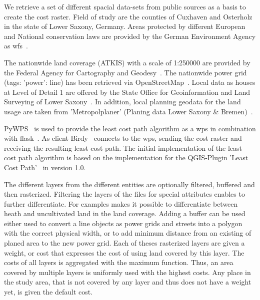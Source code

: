 
We retrieve a set of different spacial data-sets from  public sources as a basis to create the cost raster.
Field of study are the counties of Cuxhaven and Osterholz in the state of Lower Saxony, Germany.
Areas protected by different European and National conservation laws are provided by the German Environment Agency
as \acrfull{wfs}~\cite{noauthor_schutzgebiete_2015}.

The nationwide land coverage (ATKIS) with a scale of 1:250000 are provided by the Federal Agency for Cartography
and Geodesy~\cite{noauthor_digitales_2021}.
The nationwide power grid (tags: 'power': line) has been retrieved via OpenStreetMap~\cite{boeing_osmnx_2017}.
Local data as houses at Level of Detail 1 are offered by the State Office for Geoinformation and Land Surveying of
Lower Saxony~\cite{noauthor_opengeodatani_2022}.
In addition, local planning geodata for the land usage are taken
from 'Metropolplaner' (Planing data Lower Saxony \& Bremen)~\cite{noauthor_metropolplaner_2022}.

PyWPS~\cite{noauthor_welcome_2016} is used to provide the least cost path algorithm as a \acrfull{wps} in combination with flask~\cite{noauthor_flask_nodate}.
As client Birdy~\cite{noauthor_birdy_nodate} connects to the \acrshort{wps}, sending the cost raster and receiving the resulting least cost path.
The initial implementation of the least cost path algorithm is based on the implementation for the QGIS-Plugin
'Least Cost Path'~\cite{noauthor_leastcostpathdijkstra_algorithmpy_2022} in version 1.0.


The different layers from the different entities are optionally filtered, buffered and then rasterized.
Filtering the layers of the files for special attributes enables to further differentiate.
For examples makes it possible to differentiate between heath and uncultivated land in the land coverage.
Adding a buffer can be used either used to convert a line objects as power grids and streets into a polygon with the
correct physical width, or to add minimum distance from an existing of planed area to the new power grid.
Each of theses rasterized layers are given a weight, or cost that expresses the cost of using land covered by this layer.
The costs of all layers is aggregated with the maximum function.
Thus, an area covered by multiple layers is uniformly used with the highest costs.
Any place in the study area, that is not covered by any layer and thus does not have a weight yet, is given the default cost.

